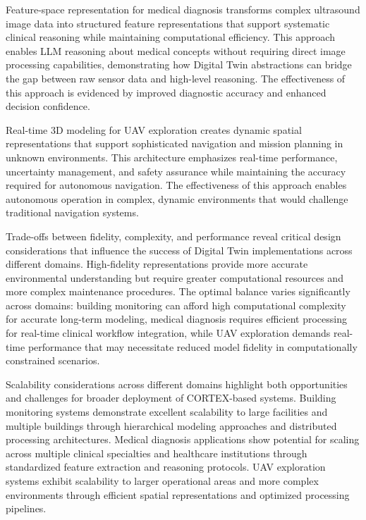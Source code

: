 Feature-space representation for medical diagnosis transforms complex ultrasound image data into structured feature representations that support systematic clinical reasoning while maintaining computational efficiency. This approach enables LLM reasoning about medical concepts without requiring direct image processing capabilities, demonstrating how Digital Twin abstractions can bridge the gap between raw sensor data and high-level reasoning. The effectiveness of this approach is evidenced by improved diagnostic accuracy and enhanced decision confidence.

Real-time 3D modeling for UAV exploration creates dynamic spatial representations that support sophisticated navigation and mission planning in unknown environments. This architecture emphasizes real-time performance, uncertainty management, and safety assurance while maintaining the accuracy required for autonomous navigation. The effectiveness of this approach enables autonomous operation in complex, dynamic environments that would challenge traditional navigation systems.

Trade-offs between fidelity, complexity, and performance reveal critical design considerations that influence the success of Digital Twin implementations across different domains. High-fidelity representations provide more accurate environmental understanding but require greater computational resources and more complex maintenance procedures. The optimal balance varies significantly across domains: building monitoring can afford high computational complexity for accurate long-term modeling, medical diagnosis requires efficient processing for real-time clinical workflow integration, while UAV exploration demands real-time performance that may necessitate reduced model fidelity in computationally constrained scenarios.

Scalability considerations across different domains highlight both opportunities and challenges for broader deployment of CORTEX-based systems. Building monitoring systems demonstrate excellent scalability to large facilities and multiple buildings through hierarchical modeling approaches and distributed processing architectures. Medical diagnosis applications show potential for scaling across multiple clinical specialties and healthcare institutions through standardized feature extraction and reasoning protocols. UAV exploration systems exhibit scalability to larger operational areas and more complex environments through efficient spatial representations and optimized processing pipelines.

